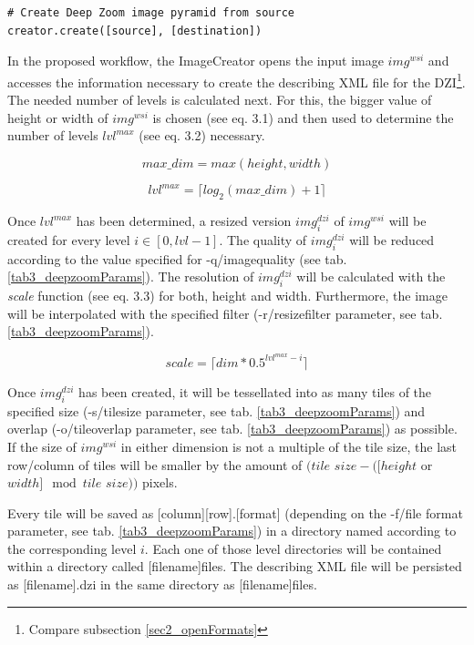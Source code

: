 \begin{lstlisting}[frame=single]
# Create Deep Zoom image pyramid from source
creator.create([source], [destination])
\end{lstlisting}

In the proposed workflow, the ImageCreator opens the input image $img^{wsi}$ and accesses the information necessary to create the describing XML file for the DZI\footnote{Compare subsection \ref{sec2_openFormats}}. The needed number of levels is calculated next. For this, the bigger value of height or width of $img^{wsi}$ is chosen (see eq. 3.1) and then used to determine the number of levels $lvl^{max}$ (see eq. 3.2) necessary.

\begin{equation}
	max{\_}dim = max(height, width)
\end{equation}

\begin{equation}
	lvl^{max} = {\lceil}log_2(max{\_}dim) + 1\rceil
\end{equation}

Once $lvl^{max}$ has been determined, a resized version $img^{dzi}_i$ of $img^{wsi}$ will be created for every level $i \in [0, lvl-1]$. The quality of $img^{dzi}_i$ will be reduced according to the value specified for -q/image{\textunderscore}quality (see tab. \ref{tab3_deepzoomParams}). The resolution of $img^{dzi}_i$ will be calculated with the \emph{scale} function (see eq. 3.3) for both, height and width. Furthermore, the image will be interpolated with the specified filter (-r/resize{\textunderscore}filter parameter, see tab. \ref{tab3_deepzoomParams}).

\begin{equation}
	scale = {\lceil}dim * 0.5^{lvl^{max}-i}\rceil
\end{equation}

Once $img^{dzi}_i$ has been created, it will be tessellated into as many tiles of the specified size (-s/tile{\textunderscore}size parameter, see tab. \ref{tab3_deepzoomParams}) and overlap (-o/tile{\textunderscore}overlap parameter, see tab. \ref{tab3_deepzoomParams}) as possible. If the size of $img^{wsi}$ in either dimension is not a multiple of the tile size, the last row/column of tiles will be smaller by the amount of $(tile$ $size - ([height$ or $width] \mod tile$ $size))$ pixels.

Every tile will be saved as [column]{\textunderscore}[row].[format] (depending on the -f/file{\textunderscore} format parameter, see tab. \ref{tab3_deepzoomParams}) in a directory named according to the corresponding level $i$. Each one of those level directories will be contained within a directory called [filename]{\textunderscore}files. The describing XML file will be persisted as [filename].dzi in the same directory as [filename]{\textunderscore}files.


